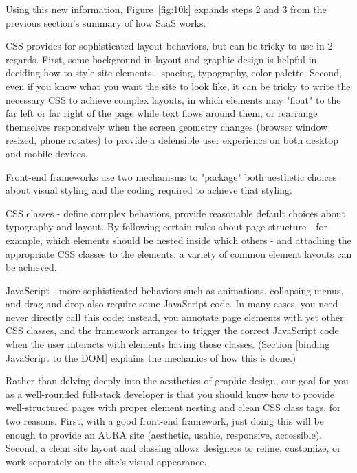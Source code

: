 Using this new information,
Figure~\ref{fig:10k}  expands steps 2 and 3 from the previous section's
summary of how SaaS works.

%
%
%
%

\begin{NEW}

  CSS provides for sophisticated layout behaviors, but can be tricky
  to use in 2 regards. First, some background in layout and graphic
  design is helpful in deciding how to style site elements - spacing,
  typography, color palette. Second, even if you know what you want
  the site to look like, it can be tricky to write the necessary CSS
  to achieve complex layouts, in which elements may "float" to the far
  left or far right of the page while text flows around them, or
  rearrange themselves responsively when the screen geometry changes
  (browser window resized, phone rotates) to provide a defensible user
  experience on both desktop and mobile devices.

Front-end frameworks use two mechanisms to "package" both aesthetic
choices about visual styling and the coding required to achieve that
styling.

CSS classes - define complex behaviors, provide reasonable default
choices about typography and layout. By following certain rules about
page structure - for example, which elements should be nested inside
which others - and attaching the appropriate CSS classes to the
elements, a variety of common element layouts can be achieved.

JavaScript - more sophisticated behaviors such as animations,
collapsing menus, and drag-and-drop also require some JavaScript
code. In many cases, you need never directly call this code: instead,
you annotate page elements with yet other CSS classes, and the
framework arranges to trigger the correct JavaScript code when the
user interacts with elements having those classes. (Section [binding
  JavaScript to the DOM] explains the mechanics of how this is done.)

Rather than delving deeply into the aesthetics of graphic design, our
goal for you as a well-rounded full-stack developer is that you should
know how to provide well-structured pages with proper element nesting
and clean CSS class tags, for two reasons. First, with a good
front-end framework, just doing this will be enough to provide an AURA
site (aesthetic, usable, responsive, accessible). Second, a clean site
layout and classing allows designers to refine, customize, or work
separately on the site's visual appearance.


\end{NEW}
